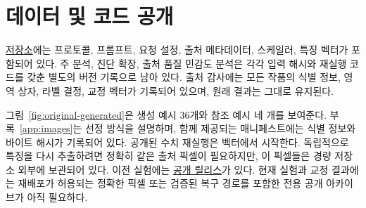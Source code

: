 \documentclass[11pt,a4paper]{article}
\begin{document}
\section*{데이터 및 코드 공개}
\href{https://github.com/isingmodel/latent-art-bench}{저장소}에는 프로토콜, 프롬프트, 요청 설정, 출처 메타데이터, 스케일러, 특징 벡터가 포함되어 있다. 주 분석, 진단 확장, 출처 품질 민감도 분석은 각각 입력 해시와 재실행 코드를 갖춘 별도의 버전 기록으로 남아 있다. 출처 감사에는 모든 작품의 식별 정보, 영역 상자, 라벨 결정, 교정 벡터가 기록되어 있으며, 원래 결과는 그대로 유지된다.

그림~\ref{fig:original-generated}은 생성 예시 36개와 참조 예시 네 개를 보여준다. 부록~\ref{app:images}는 선정 방식을 설명하며, 함께 제공되는 매니페스트에는 식별 정보와 바이트 해시가 기록되어 있다. 공개된 수치 재실행은 벡터에서 시작한다. 독립적으로 특징을 다시 추출하려면 정확히 같은 출처 픽셀이 필요하지만, 이 픽셀들은 경량 저장소 외부에 보관되어 있다. 이전 실험에는 \href{https://github.com/isingmodel/latent-art-bench/releases}{공개 릴리스}가 있다. 현재 실험과 교정 결과에는 재배포가 허용되는 정확한 픽셀 또는 검증된 복구 경로를 포함한 전용 공개 아카이브가 아직 필요하다.
\end{document}
